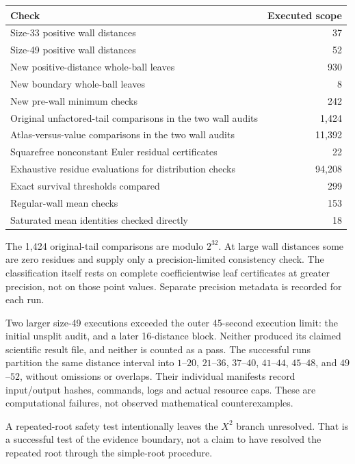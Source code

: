 \documentclass[11pt,letterpaper]{article}
\begin{document}
\begin{longtable}[]{@{}lr@{}}
\toprule\noalign{}
Check & Executed scope \\
\midrule\noalign{}
\endhead
\bottomrule\noalign{}
\endlastfoot
Size-33 positive wall distances & 37 \\
Size-49 positive wall distances & 52 \\
New positive-distance whole-ball leaves & 930 \\
New boundary whole-ball leaves & 8 \\
New pre-wall minimum checks & 242 \\
Original unfactored-tail comparisons in the two wall audits & 1,424 \\
Atlas-versus-value comparisons in the two wall audits & 11,392 \\
Squarefree nonconstant Euler residual certificates & 22 \\
Exhaustive residue evaluations for distribution checks & 94,208 \\
Exact survival thresholds compared & 299 \\
Regular-wall mean checks & 153 \\
Saturated mean identities checked directly & 18 \\
\end{longtable}

The 1,424 original-tail comparisons are modulo \(2^{32}\). At large wall distances some are zero residues and supply only a precision-limited consistency check. The classification itself rests on complete coefficientwise leaf certificates at greater precision, not on those point values. Separate precision metadata is recorded for each run.

Two larger size-49 executions exceeded the outer 45-second execution limit: the initial unsplit audit, and a later 16-distance block. Neither produced its claimed scientific result file, and neither is counted as a pass. The successful runs partition the same distance interval into \(1\)--\(20\), \(21\)--\(36\), \(37\)--\(40\), \(41\)--\(44\), \(45\)--\(48\), and \(49\)--\(52\), without omissions or overlaps. Their individual manifests record input/output hashes, commands, logs and actual resource caps. These are computational failures, not observed mathematical counterexamples.

A repeated-root safety test intentionally leaves the \(X^2\) branch unresolved. That is a successful test of the evidence boundary, not a claim to have resolved the repeated root through the simple-root procedure.
\end{document}
